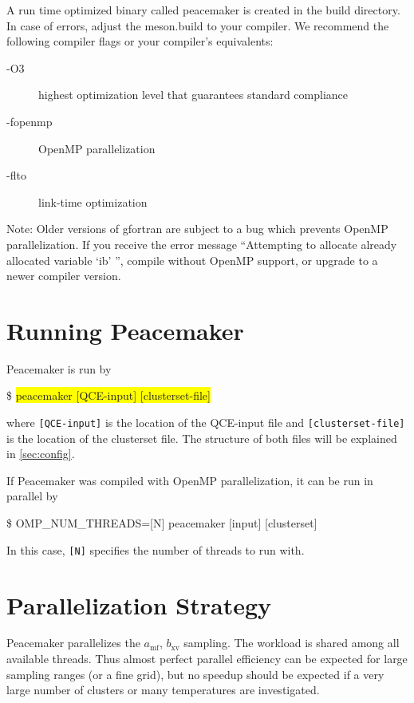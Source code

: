 \documentclass{scrartcl}
\newcommand{\amf}{a_\mathrm{mf}}
\newcommand{\bxv}{b_\mathrm{xv}}
\begin{document}
A run time optimized binary called peacemaker is created in the build directory.
In case of errors, adjust the meson.build to your compiler.
We recommend the following compiler flags or your compiler's equivalents:
\begin{addmargin}[1cm]{0cm}
    \begin{description}
        \item[-O3] highest optimization level that guarantees standard compliance
        \item[-fopenmp] OpenMP parallelization
        \item[-flto] link-time optimization
    \end{description}
\end{addmargin}

Note: Older versions of gfortran are subject to a bug which prevents OpenMP parallelization.
If you receive the error message ``Attempting to allocate already allocated variable `ib' '', 
compile without OpenMP support, or upgrade to a newer compiler version.

\section{Running Peacemaker}

Peacemaker is run by
\begin{addmargin}[1cm]{0cm}
    \ttfamily
    \$ \colorbox{yellow}{peacemaker [QCE-input] [clusterset-file]}
\end{addmargin}
where \texttt{[QCE-input]} is the location of the QCE-input file and \texttt{[clusterset-file]} 
is the location of the clusterset file.
The structure of both files will be explained in \cref{sec:config}.

If Peacemaker was compiled with OpenMP parallelization, it can be run in parallel by
\begin{addmargin}[1cm]{0cm}
    \ttfamily
    \$ OMP\_NUM\_THREADS=[N] peacemaker [input] [clusterset]
\end{addmargin}
In this case, \texttt{[N]} specifies the number of threads to run with.

\newpage

\section{Parallelization Strategy}

Peacemaker parallelizes the $\amf$, $\bxv$ sampling.
The workload is shared among all available threads.
Thus almost perfect parallel efficiency can be expected for large sampling ranges (or a fine grid), 
but no speedup should be expected
if a very large number of clusters or many temperatures are investigated.
\end{document}
